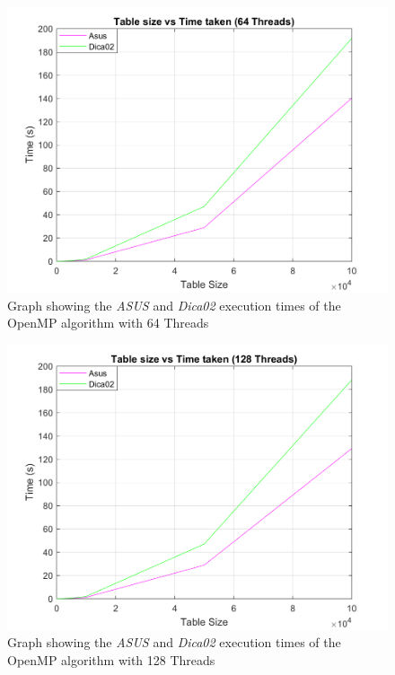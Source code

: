 \documentclass[10pt, conference]{IEEEtran}
\begin{document}
\begin{figure}[h!]
\renewcommand{\thefigure}{\arabic{figure}}
\centering
\includegraphics[scale=0.30]{Thread64.png}
\caption{Graph showing the \emph{ASUS} and \emph{Dica02} execution times of the OpenMP algorithm with 64 Threads}
\label{fig: OpenMP Thread64}
\end{figure}
\begin{figure}[h!]
\renewcommand{\thefigure}{\arabic{figure}}
\centering
\includegraphics[scale=0.30]{Thread128.png}
\caption{Graph showing the \emph{ASUS} and \emph{Dica02} execution times of the OpenMP algorithm with 128 Threads}
\label{fig: OpenMP Thread128}
\end{figure}
\end{document}
